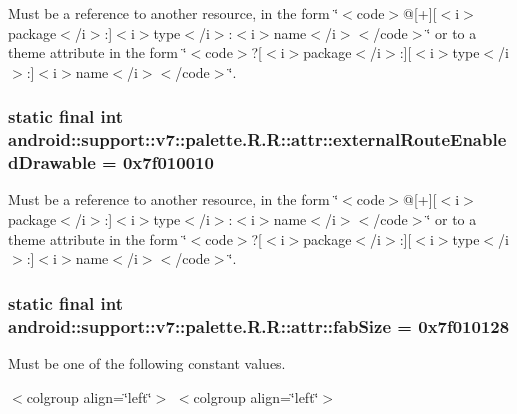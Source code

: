 Must be a reference to another resource, in the form \char`\"{}$<$code$>$@\mbox{[}+\mbox{]}\mbox{[}$<$i$>$package$<$/i$>$:\mbox{]}$<$i$>$type$<$/i$>$:$<$i$>$name$<$/i$>$$<$/code$>$\char`\"{} or to a theme attribute in the form \char`\"{}$<$code$>$?\mbox{[}$<$i$>$package$<$/i$>$:\mbox{]}\mbox{[}$<$i$>$type$<$/i$>$:\mbox{]}$<$i$>$name$<$/i$>$$<$/code$>$\char`\"{}. \hypertarget{classandroid_1_1support_1_1v7_1_1palette_1_1_r_1_1attr_bc434733783c2a7689b0167a34a2187b}{
\subsubsection[{externalRouteEnabledDrawable}]{\setlength{\rightskip}{0pt plus 5cm}static final int android::support::v7::palette.R.R::attr::externalRouteEnabledDrawable = 0x7f010010}}
\label{classandroid_1_1support_1_1v7_1_1palette_1_1_r_1_1attr_bc434733783c2a7689b0167a34a2187b}


Must be a reference to another resource, in the form \char`\"{}$<$code$>$@\mbox{[}+\mbox{]}\mbox{[}$<$i$>$package$<$/i$>$:\mbox{]}$<$i$>$type$<$/i$>$:$<$i$>$name$<$/i$>$$<$/code$>$\char`\"{} or to a theme attribute in the form \char`\"{}$<$code$>$?\mbox{[}$<$i$>$package$<$/i$>$:\mbox{]}\mbox{[}$<$i$>$type$<$/i$>$:\mbox{]}$<$i$>$name$<$/i$>$$<$/code$>$\char`\"{}. \hypertarget{classandroid_1_1support_1_1v7_1_1palette_1_1_r_1_1attr_da32a515fa0259a77929702bdf6993a7}{
\subsubsection[{fabSize}]{\setlength{\rightskip}{0pt plus 5cm}static final int android::support::v7::palette.R.R::attr::fabSize = 0x7f010128}}
\label{classandroid_1_1support_1_1v7_1_1palette_1_1_r_1_1attr_da32a515fa0259a77929702bdf6993a7}


Must be one of the following constant values. \begin{TabularC}{0}
\hline
\end{TabularC}
$<$colgroup align=\char`\"{}left\char`\"{}$>$ $<$colgroup align=\char`\"{}left\char`\"{}$>$ 


